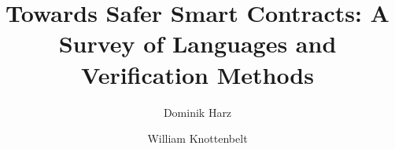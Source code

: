 \title{Towards Safer Smart Contracts: A Survey of Languages and Verification Methods}
\author{Dominik Harz \and William Knottenbelt}



\maketitle















